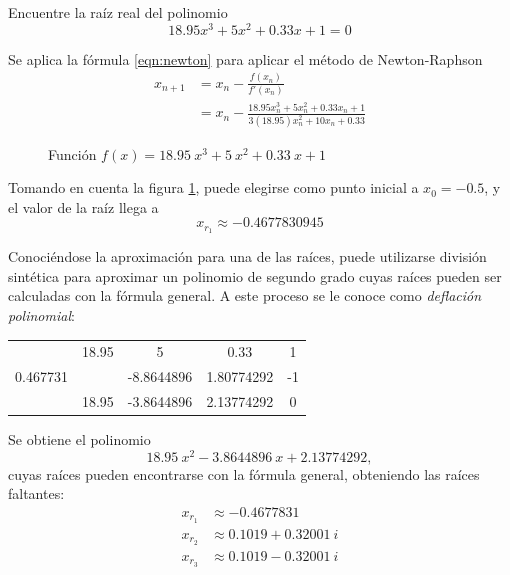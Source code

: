 \begin{ex}
    Encuentre la raíz real del polinomio 
    \[
        18.95x^3 + 5x^2  + 0.33x + 1 = 0
    \]

    \begin{solution}
        Se aplica la fórmula \ref{eqn:newton} para aplicar el método de
        Newton-Raphson
        \begin{align*}
            x_{n+1} &= x_n - \frac{f(x_n)}{f'(x_n)} \\
                &= x_n - \frac{18.95x_n^3 + 5x_n^2 + 0.33x_n +
                1}{3(18.95)x_n^2 + 10x_n + 0.33}
        \end{align*}

        \begin{figure}
            \centering
            \caption{Función $f(x) = 18.95\ x^3 + 5\ x^2 + 0.33\ x + 1$}
            \label{fig:ejercicio-newton-2}
        \end{figure}

        Tomando en cuenta la figura \ref{fig:ejercicio-newton-2}, puede
        elegirse como punto inicial a \(x_0 = -0.5 \), y el valor de la raíz
        llega a
        \[
            \boxed{x_{r_1} \approx -0.4677830945}
        \]

        Conociéndose la aproximación para una de las raíces, puede utilizarse
        división sintética para aproximar un polinomio de segundo grado cuyas
        raíces pueden ser calculadas con la fórmula general. A este proceso se
        le conoce como \textit{deflación polinomial}:

        \begin{center}
            \begin{tabular}{ c | c c c c }
                & 18.95 & 5 & 0.33 & 1 \\
                    0.467731 & & -8.8644896 & 1.80774292 & -1 \\
             \hline
                 & 18.95 & -3.8644896 & 2.13774292 & 0
            \end{tabular}
        \end{center}

        Se obtiene el polinomio
        \[
            18.95\ x^2 - 3.8644896\ x + 2.13774292,
        \]
        cuyas raíces pueden encontrarse con la fórmula general,
        obteniendo las raíces faltantes:
        \begin{align*}
            x_{r_1} & \approx -0.4677831 \\
            x_{r_2} & \approx 0.1019 + 0.32001\ i \\
            x_{r_3} & \approx 0.1019 - 0.32001\ i 
        \end{align*}
    \end{solution}
\end{ex}


